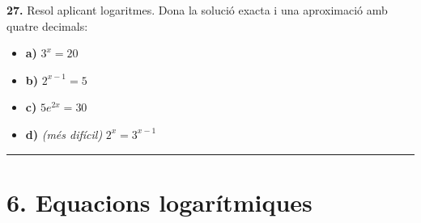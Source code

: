 \documentclass[13pt,a4paper]{extarticle}
\begin{document}
\par\noindent\begin{minipage}{\linewidth}
\textbf{27.} Resol aplicant logaritmes. Dona la solució exacta i una aproximació amb quatre decimals:\par

\begin{itemize}[leftmargin=0pt,itemsep=6pt,topsep=4pt,parsep=0pt,label={}]
\item \textbf{a)} $3^{x}=20$
\item \textbf{b)} $2^{x-1}=5$
\item \textbf{c)} $5e^{2x}=30$
\item \textbf{d)} \emph{(més difícil)} $2^{x}=3^{x-1}$
\end{itemize}
\end{minipage}\par\vspace{1.6mm}

\vspace{1mm}\hrule\vspace{3mm}

\section*{6. Equacions logarítmiques}
\end{document}
